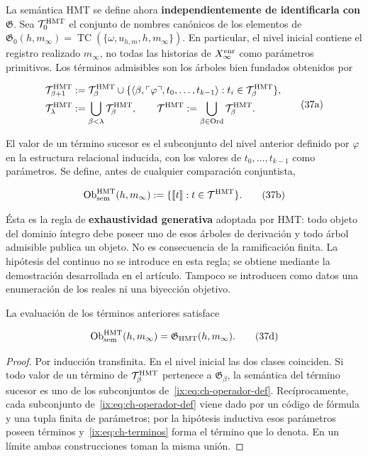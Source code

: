 La semántica HMT se define ahora \textbf{independientemente de identificarla con \(\mathfrak G\)}. Sea \(\mathcal T_0^{\rm HMT}\) el conjunto de nombres
canónicos de los elementos de
\(\mathfrak G_0(h,m_\infty)=
\operatorname{TC}(\{\omega,u_{h,m},h,m_\infty\})\). En particular, el nivel
inicial contiene el registro realizado \(m_\infty\), no todas las historias de
\(X_\infty^{\rm enr}\) como parámetros primitivos.
Los términos admisibles son los árboles bien fundados obtenidos por

\[
 \begin{aligned}
 \mathcal T^{\rm HMT}_{\beta+1}
 &:={\mathcal T}^{\rm HMT}_\beta\cup
 \{\langle\beta,\ulcorner\varphi\urcorner,
       t_0,\ldots,t_{k-1}\rangle:
       t_i\in\mathcal T^{\rm HMT}_\beta\},\\
 \mathcal T^{\rm HMT}_\lambda&:=
       \bigcup_{\beta<\lambda}\mathcal T^{\rm HMT}_\beta,
 \qquad
 \mathcal T^{\rm HMT}:=
       \bigcup_{\beta\in\operatorname{Ord}}\mathcal T^{\rm HMT}_\beta.
 \end{aligned}
\tag{37a}\label{ix:eq:ch-terminos}
\]

El valor de un término sucesor es el subconjunto del nivel anterior definido
por \(\varphi\) en la estructura relacional inducida, con los valores de
\(t_0,\ldots,t_{k-1}\) como parámetros. Se define, antes de cualquier
comparación conjuntista,

\[
 \operatorname{Ob}_{\rm sem}^{\rm HMT}(h,m_\infty)
 :=\{\llbracket t\rrbracket:t\in\mathcal T^{\rm HMT}\}.
\tag{37b}\label{ix:eq:ch-objetos-semanticos}
\]

Ésta es la regla de \textbf{exhaustividad generativa} adoptada por HMT: todo
objeto del dominio íntegro debe poseer uno de esos árboles de derivación y todo
árbol admisible publica un objeto. No es consecuencia de la ramificación
finita. La hipótesis del continuo no se introduce en esta regla; se obtiene
mediante la demostración desarrollada en el artículo. Tampoco se introducen
como datos una enumeración de los reales ni una biyección objetivo.

\begin{theorem}
\label{ix:thm:ch-6a}
La evaluación de
los términos anteriores satisface

\[
 \operatorname{Ob}_{\rm sem}^{\rm HMT}(h,m_\infty)
 =\mathfrak G_{\rm HMT}(h,m_\infty).
\tag{37d}\label{ix:eq:ch-equivalencia-semantica}
\]

\end{theorem}
\begin{proof}
Por inducción transfinita. En el nivel inicial las dos clases
coinciden. Si todo valor de un término de
\(\mathcal T^{\rm HMT}_\beta\) pertenece a
\(\mathfrak G_\beta\), la semántica del término sucesor es uno de los
subconjuntos de~\eqref{ix:eq:ch-operador-def}. Recíprocamente, cada subconjunto de~\eqref{ix:eq:ch-operador-def} viene dado por
un código de fórmula y una tupla finita de parámetros; por la hipótesis
inductiva esos parámetros poseen términos y~\eqref{ix:eq:ch-terminos} forma el término que lo
denota. En un límite ambas construcciones toman la misma unión.
\end{proof}

